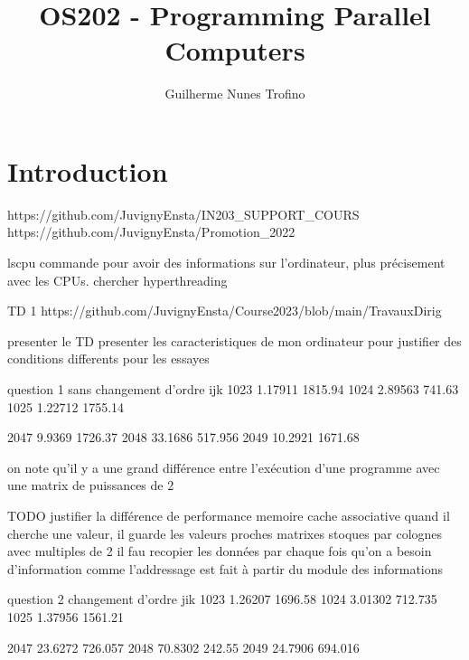 \documentclass{article}
\title{OS202 - Programming Parallel Computers}
\author{Guilherme Nunes Trofino}
\begin{document}
\maketitle
\setlength{\parindent}{0pt}

\newpage\tableofcontents

\section{Introduction}
% 
% 

% 

https://github.com/JuvignyEnsta/IN203_SUPPORT_COURS
https://github.com/JuvignyEnsta/Promotion_2022

lscpu commande pour avoir des informations sur l'ordinateur, plus précisement avec les CPUs.
chercher hyperthreading

TD 1
https://github.com/JuvignyEnsta/Course2023/blob/main/TravauxDirig%

presenter le TD
presenter les caracteristiques de mon ordinateur pour justifier des conditions differents pour les essayes

question 1
    sans changement d'ordre ijk
        1023 1.17911 1815.94
        1024 2.89563  741.63
        1025 1.22712 1755.14

        2047  9.9369 1726.37
        2048 33.1686 517.956
        2049 10.2921 1671.68

    on note qu'il y a une grand différence entre l'exécution d'une programme avec une matrix de puissances de 2

    TODO justifier la différence de performance
        memoire cache associative
        quand il cherche une valeur, il guarde les valeurs proches
        matrixes stoques par colognes
        avec multiples de 2 il fau recopier les données par chaque fois qu'on a besoin d'information
        comme l'addressage est fait à partir du module des informations 

question 2
    changement d'ordre jik
        1023 1.26207 1696.58
        1024 3.01302 712.735
        1025 1.37956 1561.21

        2047 23.6272 726.057
        2048 70.8302 242.55
        2049 24.7906 694.016
    
\end{document}
